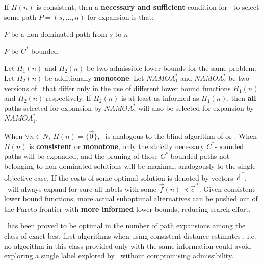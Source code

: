 \begin{teorema}\label{chapFormalAnalysis:teo:multiObjAdmissibility-teorema6Namoa}
\citep[Theorem 5.9]{Mandow2010} 
If $H(n)$ is consistent, then a \textbf{necessary and sufficient} condition
for \namoa \ to select some path $P =(s,\ldots,n)$ for expansion is
that: 
\begin{description}
  \centering  
    \item[a)]$P$ be a non-dominated path from $s$ to $n$
    \item[b)]$P$ be $C^*$-bounded \quad \quad  \quad \quad \quad \quad \quad \quad \quad \quad \
\end{description}
\end{teorema}

\begin{teorema}\label{chapFormalAnalysis:teo:multiObjAdmissibility-teorema7Namoa}
\citep[Theorem 5.10]{Mandow2010} 
 Let $H_1(n)$ and $H_2(n)$ be two admissible lower bounds for the same
  problem. Let $H_2(n)$ be additionally \textbf{monotone}. Let
  $NAMOA^*_1$ and $NAMOA^*_2$ be two versions of \namoa \ that differ
  only in the use of different lower bound functions $H_1(n)$ and $H_2(n)$
  respectively. If $H_2(n)$ is at least as informed as $H_1(n)$, then
  \textbf{all} paths selected for expansion by $NAMOA^*_2$ will also be
  selected for expansion by $NAMOA^*_1$.
\end{teorema}

\begin{property}[Efficiency]\label{chapFormalAnalysis:prop:multiObjEfficiency}

When $\forall n \in N, \  H(n) = \{ \vec 0 \}$, \namoa \ is analogous to the blind algorithm of \citet{Martins1984} or \citet{Raith2009}. When $H(n)$ is \textbf{consistent} or \textbf{monotone}, only the strictly necessary $C^*$-bounded paths will be expanded, and the pruning of those $C^*$-bounded paths not belonging to non-dominated solutions will be maximal, analogously to the single-objective case. If the costs of some optimal solution is denoted by vectors $\vec c^{~*}$, \namoa \ will always expand for sure all labels with some $\vec f(n) \prec \vec  c^{~*}$. Given consistent lower bound functions,  more actual suboptimal alternatives can be pushed out of the Pareto frontier with \textbf{more informed} lower bounds, reducing search effort.
\end{property}

\begin{property}[Optimality]\label{chapFormalAnalysis:prop:multiObjOptimality}
\namoa \ has been proved to be optimal in the number of path expansions among the class of exact best-first algorithms when using consistent distance estimates \citep{Mandow2010}, i.e. no algorithm in this class provided only with the same information could avoid exploring a single label explored by \namoa \ without compromising admissibility.
\end{property}


